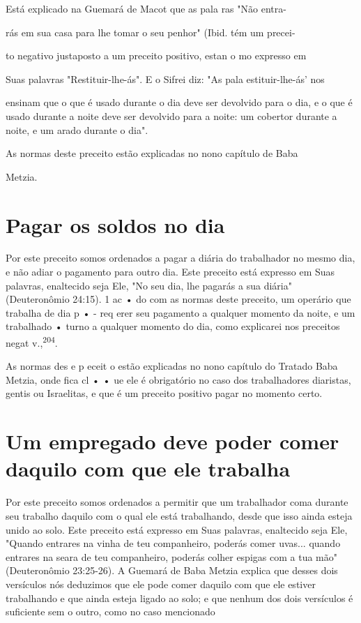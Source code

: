 \begin{itemize}
\begin{enumrate}
\begin{itemize}
\begin{itemize}
\begin{itemize}
Está explicado na Guemará de Macot que as pala ras "Não entra-


rás em sua casa para lhe tomar o seu penhor" (Ibid. tém um precei-

to negativo justaposto a um preceito positivo, estan o mo expresso em

Suas palavras "Restituir-lhe-ás". E o Sifrei diz: "As pala
estituir-lhe-ás' nos

ensinam que o que é usado durante o dia deve ser devolvido para o dia, e
o que é usado durante a noite deve ser devolvido para a noite: um
cobertor du­rante a noite, e um arado durante o dia".


As normas deste preceito estão explicadas no nono capítulo de Baba


Metzia.

\section{Pagar os soldos no dia}

Por este preceito somos ordenados a pagar a diária do trabalhador no
mesmo dia, e não adiar o pagamento para outro dia. Este preceito está
ex­presso em Suas palavras, enaltecido seja Ele, "No seu dia, lhe
pagarás a sua diá­ria" (Deuteronômio 24:15). 1 ac • do com as normas
deste preceito, um ope­rário que trabalha de dia p • - req erer seu
pagamento a qualquer momento da noite, e um trabalhado • turno a
qualquer momento do dia, como expli­carei nos preceitos negat
v.,\textsuperscript{204}.

As normas des e p eceit o estão explicadas no nono capítulo do Tra­tado
Baba Metzia, onde fica cl • • ue ele é obrigatório no caso dos
trabalhado­res diaristas, gentis ou Israelitas, e que é um preceito
positivo pagar no momento certo.

\section{Um empregado deve poder comer daquilo com que ele trabalha}

Por este preceito somos ordenados a permitir que um trabalhador coma
durante seu trabalho daquilo com o qual ele está trabalhando, desde que
isso ainda esteja unido ao solo. Este preceito está expresso em Suas
palavras, enaltecido seja Ele, "Quando entrares na vinha de teu
companheiro, poderás comer uvas... quando entrares na seara de teu
companheiro, poderás colher espigas com a tua mão" (Deuteronômio
23:25-26). A Guemará de Baba Metzia explica que desses dois versículos
nós deduzimos que ele pode comer daquilo com que ele estiver trabalhando
e que ainda esteja ligado ao solo; e que ne­nhum dos dois versículos é
suficiente sem o outro, como no caso mencionado



\end{itemize}
\end{itemize}
\end{itemize}
\end{enumrate}
\end{itemize}
